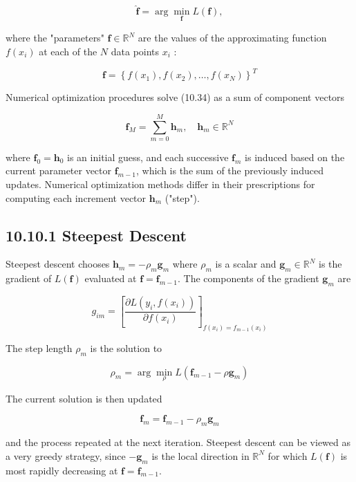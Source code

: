 \documentclass[10pt]{article}
\begin{document}
\begin{equation*}
\hat{\mathbf{f}}=\arg \min _{\mathbf{f}} L(\mathbf{f}), \tag{10.34}
\end{equation*}


where the "parameters" $\mathbf{f} \in \mathbb{R}^{N}$ are the values of the approximating function $f\left(x_{i}\right)$ at each of the $N$ data points $x_{i}$ :

$$
\mathbf{f}=\left\{f\left(x_{1}\right), f\left(x_{2}\right), \ldots, f\left(x_{N}\right)\right\}^{T}
$$

Numerical optimization procedures solve (10.34) as a sum of component vectors

$$
\mathbf{f}_{M}=\sum_{m=0}^{M} \mathbf{h}_{m}, \quad \mathbf{h}_{m} \in \mathbb{R}^{N}
$$

where $\mathbf{f}_{0}=\mathbf{h}_{0}$ is an initial guess, and each successive $\mathbf{f}_{m}$ is induced based on the current parameter vector $\mathbf{f}_{m-1}$, which is the sum of the previously induced updates. Numerical optimization methods differ in their prescriptions for computing each increment vector $\mathbf{h}_{m}$ ("step").

\subsection*{10.10.1 Steepest Descent}
Steepest descent chooses $\mathbf{h}_{m}=-\rho_{m} \mathbf{g}_{m}$ where $\rho_{m}$ is a scalar and $\mathbf{g}_{m} \in \mathbb{R}^{N}$ is the gradient of $L(\mathbf{f})$ evaluated at $\mathbf{f}=\mathbf{f}_{m-1}$. The components of the gradient $\mathbf{g}_{m}$ are


\begin{equation*}
g_{i m}=\left[\frac{\partial L\left(y_{i}, f\left(x_{i}\right)\right)}{\partial f\left(x_{i}\right)}\right]_{f\left(x_{i}\right)=f_{m-1}\left(x_{i}\right)} \tag{10.35}
\end{equation*}


The step length $\rho_{m}$ is the solution to


\begin{equation*}
\rho_{m}=\arg \min _{\rho} L\left(\mathbf{f}_{m-1}-\rho \mathbf{g}_{m}\right) \tag{10.36}
\end{equation*}


The current solution is then updated

$$
\mathbf{f}_{m}=\mathbf{f}_{m-1}-\rho_{m} \mathbf{g}_{m}
$$

and the process repeated at the next iteration. Steepest descent can be viewed as a very greedy strategy, since $-\mathbf{g}_{m}$ is the local direction in $\mathbb{R}^{N}$ for which $L(\mathbf{f})$ is most rapidly decreasing at $\mathbf{f}=\mathbf{f}_{m-1}$.
\end{document}
